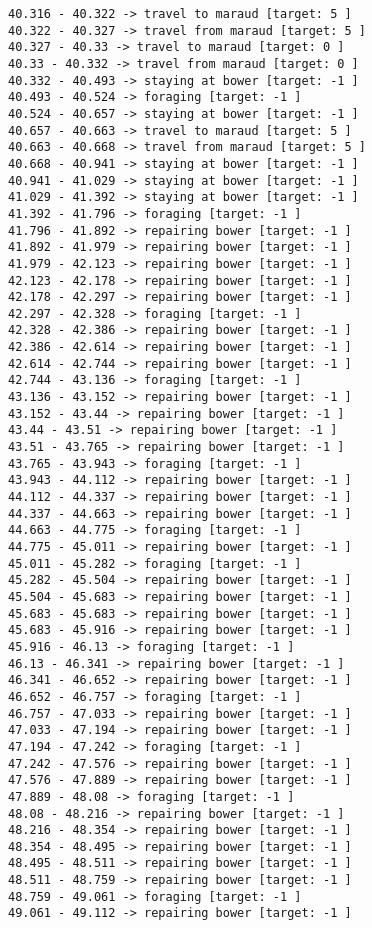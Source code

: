 \documentclass[11pt]{article}
\begin{document}
\begin{Verbatim}[commandchars=\\\{\}]
40.316 - 40.322 -> travel to maraud [target: 5 ]
40.322 - 40.327 -> travel from maraud [target: 5 ]
40.327 - 40.33 -> travel to maraud [target: 0 ]
40.33 - 40.332 -> travel from maraud [target: 0 ]
40.332 - 40.493 -> staying at bower [target: -1 ]
40.493 - 40.524 -> foraging [target: -1 ]
40.524 - 40.657 -> staying at bower [target: -1 ]
40.657 - 40.663 -> travel to maraud [target: 5 ]
40.663 - 40.668 -> travel from maraud [target: 5 ]
40.668 - 40.941 -> staying at bower [target: -1 ]
40.941 - 41.029 -> staying at bower [target: -1 ]
41.029 - 41.392 -> staying at bower [target: -1 ]
41.392 - 41.796 -> foraging [target: -1 ]
41.796 - 41.892 -> repairing bower [target: -1 ]
41.892 - 41.979 -> repairing bower [target: -1 ]
41.979 - 42.123 -> repairing bower [target: -1 ]
42.123 - 42.178 -> repairing bower [target: -1 ]
42.178 - 42.297 -> repairing bower [target: -1 ]
42.297 - 42.328 -> foraging [target: -1 ]
42.328 - 42.386 -> repairing bower [target: -1 ]
42.386 - 42.614 -> repairing bower [target: -1 ]
42.614 - 42.744 -> repairing bower [target: -1 ]
42.744 - 43.136 -> foraging [target: -1 ]
43.136 - 43.152 -> repairing bower [target: -1 ]
43.152 - 43.44 -> repairing bower [target: -1 ]
43.44 - 43.51 -> repairing bower [target: -1 ]
43.51 - 43.765 -> repairing bower [target: -1 ]
43.765 - 43.943 -> foraging [target: -1 ]
43.943 - 44.112 -> repairing bower [target: -1 ]
44.112 - 44.337 -> repairing bower [target: -1 ]
44.337 - 44.663 -> repairing bower [target: -1 ]
44.663 - 44.775 -> foraging [target: -1 ]
44.775 - 45.011 -> repairing bower [target: -1 ]
45.011 - 45.282 -> foraging [target: -1 ]
45.282 - 45.504 -> repairing bower [target: -1 ]
45.504 - 45.683 -> repairing bower [target: -1 ]
45.683 - 45.683 -> repairing bower [target: -1 ]
45.683 - 45.916 -> repairing bower [target: -1 ]
45.916 - 46.13 -> foraging [target: -1 ]
46.13 - 46.341 -> repairing bower [target: -1 ]
46.341 - 46.652 -> repairing bower [target: -1 ]
46.652 - 46.757 -> foraging [target: -1 ]
46.757 - 47.033 -> repairing bower [target: -1 ]
47.033 - 47.194 -> repairing bower [target: -1 ]
47.194 - 47.242 -> foraging [target: -1 ]
47.242 - 47.576 -> repairing bower [target: -1 ]
47.576 - 47.889 -> repairing bower [target: -1 ]
47.889 - 48.08 -> foraging [target: -1 ]
48.08 - 48.216 -> repairing bower [target: -1 ]
48.216 - 48.354 -> repairing bower [target: -1 ]
48.354 - 48.495 -> repairing bower [target: -1 ]
48.495 - 48.511 -> repairing bower [target: -1 ]
48.511 - 48.759 -> repairing bower [target: -1 ]
48.759 - 49.061 -> foraging [target: -1 ]
49.061 - 49.112 -> repairing bower [target: -1 ]

\end{Verbatim}
\end{document}
